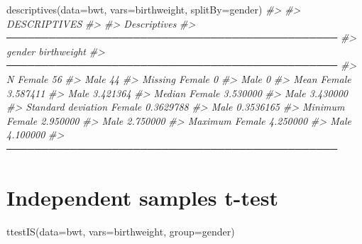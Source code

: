 \documentclass[
]{memoir}
\newenvironment{Shaded}{\begin{snugshade}}{\end{snugshade}}
\newcommand{\AttributeTok}[1]{\textcolor[rgb]{0.77,0.63,0.00}{#1}}
\newcommand{\CommentTok}[1]{\textcolor[rgb]{0.56,0.35,0.01}{\textit{#1}}}
\newcommand{\FunctionTok}[1]{\textcolor[rgb]{0.00,0.00,0.00}{#1}}
\newcommand{\NormalTok}[1]{#1}
\begin{document}
\begin{Shaded}
\begin{Highlighting}[]
\FunctionTok{descriptives}\NormalTok{(}\AttributeTok{data=}\NormalTok{bwt, }\AttributeTok{vars=}\NormalTok{birthweight, }\AttributeTok{splitBy=}\NormalTok{gender)}
\CommentTok{\#\textgreater{} }
\CommentTok{\#\textgreater{}  DESCRIPTIVES}
\CommentTok{\#\textgreater{} }
\CommentTok{\#\textgreater{}  Descriptives                                    }
\CommentTok{\#\textgreater{}  ─────────────────────────────────────────────── }
\CommentTok{\#\textgreater{}                          gender    birthweight   }
\CommentTok{\#\textgreater{}  ─────────────────────────────────────────────── }
\CommentTok{\#\textgreater{}    N                     Female             56   }
\CommentTok{\#\textgreater{}                          Male               44   }
\CommentTok{\#\textgreater{}    Missing               Female              0   }
\CommentTok{\#\textgreater{}                          Male                0   }
\CommentTok{\#\textgreater{}    Mean                  Female       3.587411   }
\CommentTok{\#\textgreater{}                          Male         3.421364   }
\CommentTok{\#\textgreater{}    Median                Female       3.530000   }
\CommentTok{\#\textgreater{}                          Male         3.430000   }
\CommentTok{\#\textgreater{}    Standard deviation    Female      0.3629788   }
\CommentTok{\#\textgreater{}                          Male        0.3536165   }
\CommentTok{\#\textgreater{}    Minimum               Female       2.950000   }
\CommentTok{\#\textgreater{}                          Male         2.750000   }
\CommentTok{\#\textgreater{}    Maximum               Female       4.250000   }
\CommentTok{\#\textgreater{}                          Male         4.100000   }
\CommentTok{\#\textgreater{}  ───────────────────────────────────────────────}
\end{Highlighting}
\end{Shaded}

\hypertarget{independent-samples-t-test}{%
\section{Independent samples t-test}\label{independent-samples-t-test}}

\begin{Shaded}
\begin{Highlighting}[]
\FunctionTok{ttestIS}\NormalTok{(}\AttributeTok{data=}\NormalTok{bwt, }\AttributeTok{vars=}\NormalTok{birthweight, }\AttributeTok{group=}\NormalTok{gender)}
\end{Highlighting}
\end{Shaded}
\end{document}
